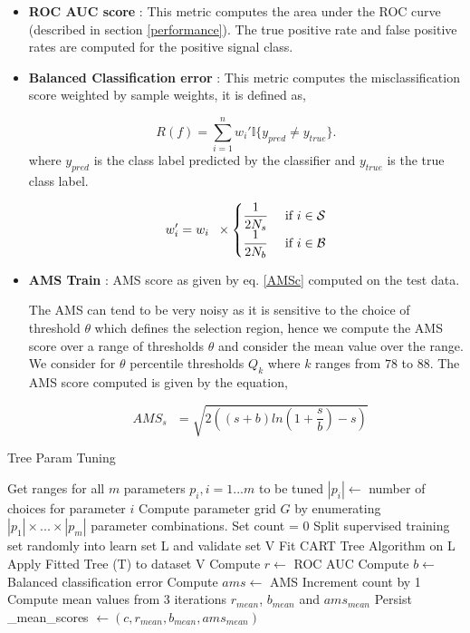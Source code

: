 \documentclass[final,3p,times,twocolumn]{elsarticle}
\begin{document}
\begin{itemize}
\item {\textbf{ROC AUC score} : This metric computes the area under the ROC curve (described in section \ref{performance}). The true positive rate and false positive rates are computed for the positive signal class.} 
\item {\textbf{Balanced Classification error} : This metric computes the misclassification score weighted by sample weights, it is defined as, 

\begin{equation} 
R(f) = \sum_{i=1}^{n}w_{i}'\mathbb{I}\{y_{pred} \neq y_{true}\}. 
\end{equation}
where $y_{pred}$ is the class label predicted by the classifier and $y_{true}$ is the true class label.
 
\begin{equation}
w_{i}' = w_{i}  \hspace{2mm} \times 
\begin{cases}
\dfrac{1}{2N_{s}} & \textrm{ if } i \in \mathcal{S} \\
\dfrac{1}{2N_{b}} & \textrm{ if } i \in \mathcal{B} 
\end{cases}
\end{equation}}
\item {\textbf{AMS Train} : AMS score as given by eq. \ref{AMSc} computed on the test data.}

The AMS can tend to be very noisy as it is sensitive to the choice of threshold $\theta$ which defines the selection region, hence we compute the AMS score over a range of thresholds $\theta$ and consider the mean value over the range. We consider for $\theta$ percentile thresholds $Q_{k}$ where $k$ ranges from $78$ to $88$. The AMS score computed is given by the equation, 

\begin{equation}
\textrm{ $AMS_{s}$ } = \sqrt{2((s + b)ln(1 + \frac{s}{b})-s)} 
\label{AMSc} 
\end{equation}
\end{itemize}

\begin{algorithm}
\caption{Tree Param Tuning}
\begin{algorithmic}[1]
\STATE Get ranges for all $m$ parameters $p_{i}, i = 1...m$ to be tuned
\STATE $|p_{i}| \leftarrow$ number of choices for parameter $i$
\STATE Compute parameter grid $G$ by enumerating $|p_{1}| \times ...\times |p_{m}|$ parameter combinations.
\STATE Set count = 0
\REPEAT 
\STATE Split supervised training set randomly into learn set L and validate set V  
\STATE Fit CART Tree Algorithm on L 
\STATE Apply Fitted Tree (T) to dataset V
\STATE Compute $r \leftarrow$ ROC AUC
\STATE Compute $b \leftarrow$ Balanced classification error
\STATE Compute $ams \leftarrow$ AMS
\STATE Increment count by 1
\STATE Compute mean values from 3 iterations $r_{mean}$, $b_{mean}$ and $ams_{mean}$ 
\STATE Persist \_mean\_scores $\leftarrow (c,r_{mean},b_{mean},ams_{mean})$ 
\ENDFOR
{}
\end{algorithmic}
\label{tree_tuning}
\end{algorithm}
\end{document}
